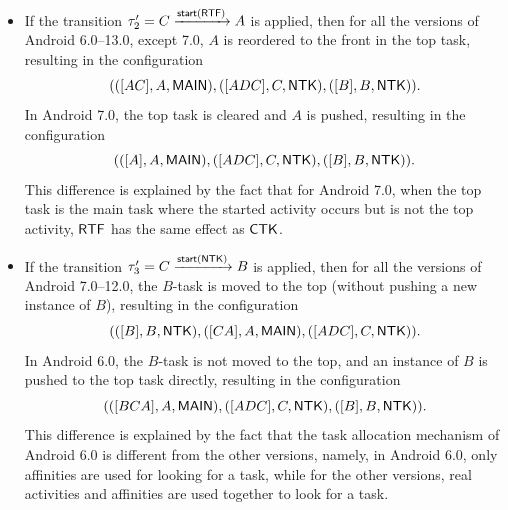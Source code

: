 \begin{example}
\begin{itemize}
        \item If the transition $\tau'_2 = C\xrightarrow{{\mathsf{start} }({\sf RTF})} A$ is applied,  then for all the versions of Android 6.0--13.0, except 7.0, $A$ is reordered to the front in the top task, resulting in the configuration 
        $$(([AC],A,{\sf MAIN}),([ADC],C,{\sf NTK}),([B],B,{\sf NTK})).$$
        In Android 7.0, the top task is cleared and $A$ is pushed, resulting in the configuration
        $$(([A],A,{\sf MAIN}),([ADC],C,{\sf NTK}),([B],B,{\sf NTK})).$$
        This difference is explained by the fact that for Android 7.0, when the top task is the main task where the started activity occurs but is not the top activity, ${\sf RTF}$ has the same effect as ${\sf CTK}$.
        \item If the transition $\tau'_3 = C\xrightarrow{{\mathsf{start} }({\sf NTK})} B$ is applied, then for all the versions of Android 7.0--12.0,  the $B$-task is moved to the top (without pushing a new instance of $B$), resulting in the configuration 
        $$(([B],B,{\sf NTK}), ([CA],A,{\sf MAIN}),([ADC],C,{\sf NTK})).$$
        In Android 6.0, the $B$-task is not moved to the top, and an instance of $B$ is pushed to the top task directly, resulting in the configuration
        $$(([BCA],A,{\sf MAIN}),([ADC],C,{\sf NTK}), ([B],B,{\sf NTK})).$$
       This difference is explained by the fact that the task allocation mechanism of Android 6.0 is different from the other versions, namely, in Android 6.0, only affinities are used for looking for a task, while for the other versions, real activities and affinities are used together to look for a task. 
    \end{itemize}


\end{example}
